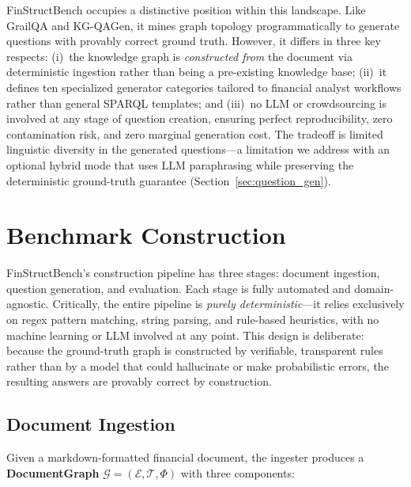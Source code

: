 \documentclass[11pt]{article}
\begin{document}
FinStructBench occupies a distinctive position within this landscape.
Like GrailQA and KG-QAGen, it mines graph topology programmatically
to generate questions with provably correct ground truth.  However, it
differs in three key respects: (i)~the knowledge graph is
\emph{constructed from} the document via deterministic ingestion rather
than being a pre-existing knowledge base; (ii)~it defines ten
specialized generator categories tailored to financial analyst workflows
rather than general SPARQL templates; and (iii)~no LLM or crowdsourcing
is involved at any stage of question creation, ensuring perfect
reproducibility, zero contamination risk, and zero marginal generation
cost.  The tradeoff is limited linguistic diversity in the generated
questions---a limitation we address with an optional hybrid mode that
uses LLM paraphrasing while preserving the deterministic ground-truth
guarantee (Section~\ref{sec:question_gen}).

\section{Benchmark Construction}
\label{sec:construction}

FinStructBench's construction pipeline has three stages: document ingestion,
question generation, and evaluation.  Each stage is fully automated and
domain-agnostic.  Critically, the entire pipeline is \emph{purely
deterministic}---it relies exclusively on regex pattern matching,
string parsing, and rule-based heuristics, with no machine learning or
LLM involved at any point.  This design is deliberate: because the
ground-truth graph is constructed by verifiable, transparent rules
rather than by a model that could hallucinate or make probabilistic
errors, the resulting answers are provably correct by construction.

\subsection{Document Ingestion}
\label{sec:ingestion}

Given a markdown-formatted financial document, the ingester produces a
\textbf{DocumentGraph} $\mathcal{G} = (\mathcal{E}, \mathcal{T}, \Phi)$
with three components:
\end{document}
